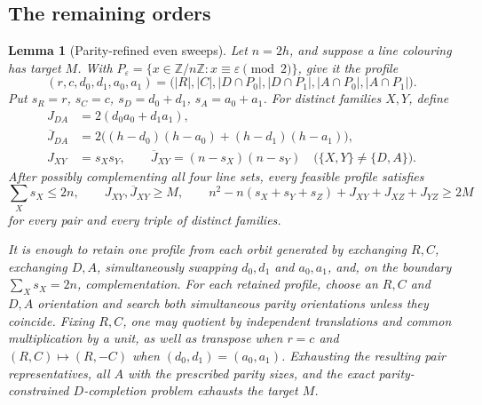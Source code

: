 \documentclass[11pt]{amsart}
\newtheorem{lemma}[theorem]{Lemma}
\theoremstyle{definition}
\theoremstyle{remark}
\newcommand{\Z}{\mathbb{Z}}
\newcommand{\Zn}{\Z/n\Z}
\begin{document}
\subsection{The remaining orders}\label{ssec:remaining}

\begin{lemma}[Parity-refined even sweeps]\label{lem:evensweep}
Let \(n=2h\), and suppose a line colouring has target \(M\).  With
\(P_\varepsilon=\{x\in\Zn:x\equiv\varepsilon\pmod2\}\), give it the profile
\[
(r,c,d_0,d_1,a_0,a_1)
=\bigl(|R|,|C|,|D\cap P_0|,|D\cap P_1|,
       |A\cap P_0|,|A\cap P_1|\bigr).
\]
Put \(s_R=r\), \(s_C=c\), \(s_D=d_0+d_1\), \(s_A=a_0+a_1\).  For distinct
families \(X,Y\), define
\[
\begin{aligned}
J_{DA}&=2(d_0a_0+d_1a_1),\\
\overline J_{DA}
&=2\bigl((h-d_0)(h-a_0)+(h-d_1)(h-a_1)\bigr),\\
J_{XY}&=s_Xs_Y,\qquad
\overline J_{XY}=(n-s_X)(n-s_Y)
\quad\bigl(\{X,Y\}\ne\{D,A\}\bigr).
\end{aligned}
\]
After possibly complementing all four line sets, every feasible profile
satisfies
\begin{equation}\label{eq:evenfilter}
\sum_X s_X\le2n,\qquad
J_{XY},\overline J_{XY}\ge M,\qquad
n^2-n(s_X+s_Y+s_Z)+J_{XY}+J_{XZ}+J_{YZ}\ge2M
\end{equation}
for every pair and every triple of distinct families.

It is enough to retain one profile from each orbit generated by exchanging
\(R,C\), exchanging \(D,A\), simultaneously swapping \(d_0,d_1\) and
\(a_0,a_1\), and, on the boundary \(\sum_X s_X=2n\), complementation.  For
each retained profile, choose an \(R,C\) and \(D,A\) orientation and search
both simultaneous parity orientations unless they coincide.  Fixing \(R,C\),
one may quotient by independent translations and common multiplication by a
unit, as well as transpose when \(r=c\) and \((R,C)\mapsto(R,-C)\) when
\((d_0,d_1)=(a_0,a_1)\).  Exhausting the resulting pair representatives,
all \(A\) with the prescribed parity sizes, and the exact parity-constrained
\(D\)-completion problem exhausts the target \(M\).
\end{lemma}
\end{document}
